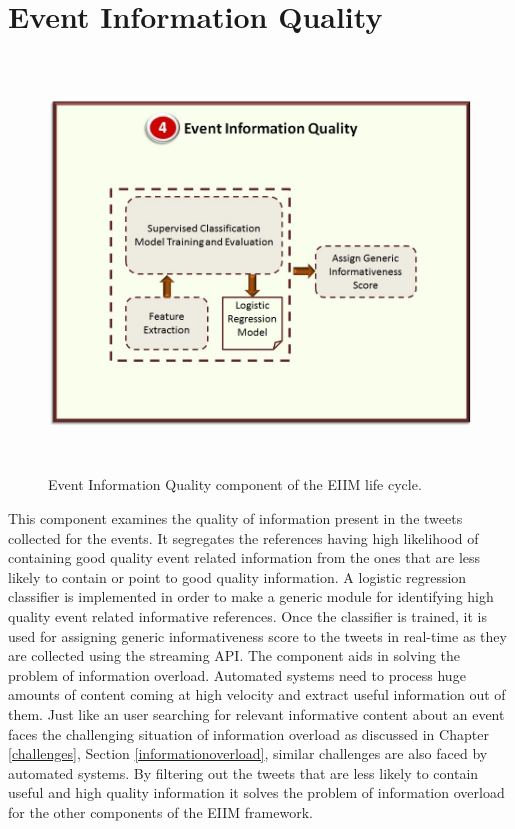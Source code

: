 \section{Event Information Quality\label{eventinfoquality}}

\begin{figure}[htbp]
  \caption{Event Information Quality component of the EIIM life cycle.}
  \centering
    \includegraphics[width=14cm,height=11cm]{Figures/EIIMComponents/EventInformationQuality.jpg}
\end{figure}

This component examines the quality of information present in the tweets collected for the events. It segregates the references having high likelihood of containing good quality event related information from the ones that are less likely to contain or point to good quality information. A logistic regression classifier is implemented in order to make a generic module for identifying high quality event related informative references. Once the classifier is trained, it is used for assigning generic informativeness score to the tweets in real-time as they are collected using the streaming API. The component aids in solving the problem of information overload. Automated systems need to process huge amounts of content coming at high velocity and extract useful information out of them. Just like an user searching for relevant informative content about an event faces the challenging situation of information overload as discussed in Chapter \ref{challenges}, Section \ref{informationoverload}, similar challenges are also faced by automated systems. By filtering out the tweets that are less likely to contain useful and high quality  information it solves the problem of information overload for the other components of the EIIM framework. 

